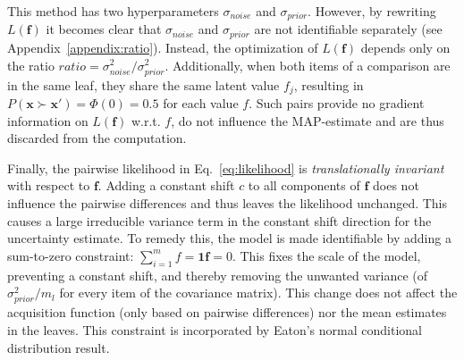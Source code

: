 \documentclass{article}
\begin{document}
This method has two hyperparameters $\sigma_{noise}$ and $\sigma_{prior}$. 
However, by rewriting $L(\mathbf{f})$ it becomes clear that $\sigma_{{noise}}$ and $\sigma_{{prior}}$ are not identifiable separately (see Appendix~\ref{appendix:ratio}). Instead, the optimization of $L(\mathbf{f})$ depends only on the ratio $ratio = \sigma_{{noise}}^2 / \sigma_{{prior}}^2$.
Additionally, when both items of a comparison are in the same leaf, they share the same latent value $f_j$, resulting in $P(\mathbf{x}\succ \mathbf{x}')=\Phi(0)=0.5$ for each value $f$. Such pairs provide no gradient information on $L(\mathbf{f})$ w.r.t. $f$, do not influence the MAP-estimate and are thus discarded from the computation. 


Finally, the pairwise likelihood in Eq.~\ref{eq:likelihood} is \emph{translationally invariant} with respect to \(\mathbf{f}\). Adding a constant shift \(c\) to all components of \(\mathbf{f}\) does not influence the pairwise differences and thus leaves the likelihood unchanged. This causes a large irreducible variance term in the constant shift direction for the uncertainty estimate. To remedy this, the model is made identifiable by adding a sum-to-zero constraint: $\sum_{i=1}^mf = \mathbf{1}\mathbf{f} = 0$. This fixes the scale of the model, preventing a constant shift, and thereby removing the unwanted variance (of $\sigma_{prior}^2/m_l$ for every item of the covariance matrix). This change does not affect the acquisition function (only based on pairwise differences) nor the mean estimates in the leaves. This constraint is incorporated by Eaton's \cite{Eaton2007} normal conditional distribution result.
\end{document}
